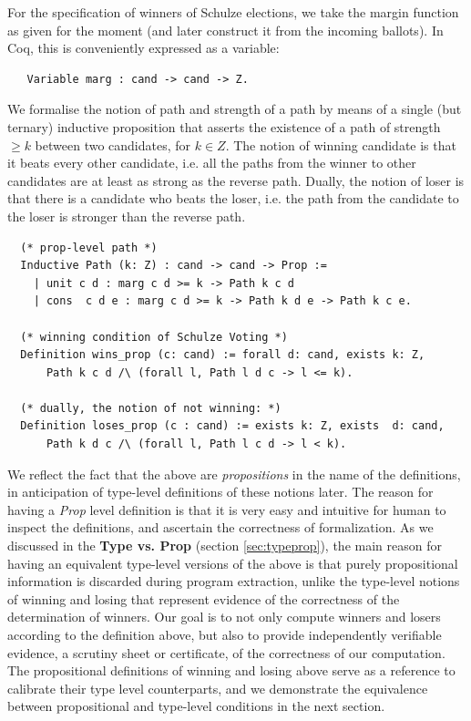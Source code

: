 \noindent
For the specification of winners of Schulze elections, we take the
margin function as given for the moment (and later construct it from
the incoming ballots). In Coq, this is conveniently expressed as a
variable:
\begin{verbatim}
   Variable marg : cand -> cand -> Z.
\end{verbatim}

\noindent
We formalise the notion of path and strength of a path by means of a
single (but ternary) inductive proposition that asserts the
existence of a path of strength $\geq k$ between two candidates, for
$k \in Z$. The notion of winning candidate is that it beats every other candidate, i.e.  all the paths from 
the winner to other candidates are at least as strong as the reverse path. Dually, the notion of loser
 is that there is a candidate who beats the loser, i.e. the path from the candidate to the loser is 
 stronger than the reverse path. 


\begin{verbatim}
  (* prop-level path *)
  Inductive Path (k: Z) : cand -> cand -> Prop :=
    | unit c d : marg c d >= k -> Path k c d
    | cons  c d e : marg c d >= k -> Path k d e -> Path k c e.
    
  (* winning condition of Schulze Voting *)
  Definition wins_prop (c: cand) := forall d: cand, exists k: Z,
      Path k c d /\ (forall l, Path l d c -> l <= k).

  (* dually, the notion of not winning: *)
  Definition loses_prop (c : cand) := exists k: Z, exists  d: cand,
      Path k d c /\ (forall l, Path l c d -> l < k).
\end{verbatim}


\noindent
We reflect the fact that the above are \emph{propositions} in
the name of the definitions, in anticipation of type-level
definitions of these notions later. The reason for having a \textit{Prop} level definition is that 
 it is very easy  and intuitive for human to inspect the definitions, and ascertain the correctness of formalization.
As we discussed in the
\textbf{Type vs. Prop} (section \ref{sec:typeprop}), the main reason 
for having an equivalent
type-level versions of the above is that purely propositional
information is discarded during program extraction, unlike
the type-level notions of winning and losing that represent evidence
of the correctness of the determination of winners. Our goal is to 
not only compute winners and losers according to the
definition above, but also to provide independently verifiable
evidence, a scrutiny sheet or certificate, of the correctness of our computation.
The propositional
definitions of winning and losing above serve as a reference to
calibrate their type level counterparts, and we demonstrate the
equivalence between propositional and type-level conditions in the
next section. 


